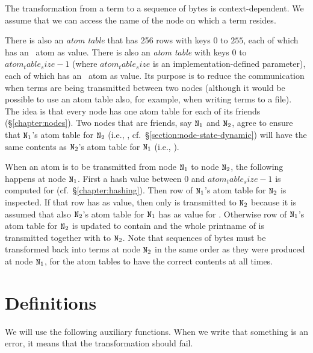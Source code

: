 \label{section:atom-tables}

The transformation from a term to a sequence of bytes is context-dependent.
We assume that we can access the name of the node on which a term 
resides.

\ifOld
There is also an \emph{atom table} that has 256 rows with keys
$0$ to $255$, each of which has an \Erlang\ atom as value.
\fi
\ifStd
There is also an \emph{atom table} with keys $0$ to
$\mathit{atom_table_size}-1$ (where $\mathit{atom_table_size}$ is an
implementation-defined parameter), each of which has an \Erlang\ atom
as value.
\fi
Its purpose is to reduce the communication when terms are being
transmitted between two nodes (although it would be possible to use an
atom table also, for example, when writing terms to a file).  The idea
is that every node has one atom table for each of its
friends (\S\ref{chapter:nodes}).  Two nodes
that are friends, say ${\tt{\sl N}}_1$ and ${\tt{\sl N}}_2$, agree to ensure that
${\tt{\sl N}}_1$'s atom table for ${\tt{\sl N}}_2$ (i.e.,
,
cf.\ \S\ref{section:node-state-dynamic})
will have the same contents as
${\tt{\sl N}}_2$'s atom table for
${\tt{\sl N}}_1$ (i.e., ).

When an atom  is to be transmitted from node ${\tt{\sl N}}_1$ to
node ${\tt{\sl N}}_2$, the following
happens at node ${\tt{\sl N}}_1$.  First a hash value  between 0 and
 \fi
\ifStd $\mathit{atom_table_size}-1$ \fi
is computed for  (cf.\ \S\ref{chapter:hashing}).  Then row
 of ${\tt{\sl N}}_1$'s atom table for ${\tt{\sl N}}_2$ is inspected.  If
that row has  as value, then only  is transmitted to
${\tt{\sl N}}_2$ because it is assumed that also ${\tt{\sl N}}_2$'s atom table for
${\tt{\sl N}}_1$ has  as value for .  Otherwise row  of
${\tt{\sl N}}_1$'s atom table for ${\tt{\sl N}}_2$ is updated to contain 
and the whole printname of  is transmitted together with 
to ${\tt{\sl N}}_2$.  Note that sequences of bytes must be transformed back
into terms at node ${\tt{\sl N}}_2$ in the same order as they were produced
at node ${\tt{\sl N}}_1$, for the atom tables to have the correct contents
at all times.

\section{Definitions}

We will use the following auxiliary functions.  When we write that
something is an error, it means that the transformation should fail.


